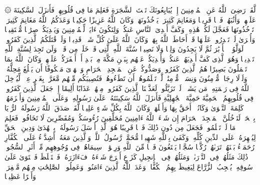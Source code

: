 \startbuffer[\q:48:18]
۞ لَّقَدۡ رَضِیَ ٱللَّهُ عَنِ ٱلۡمُؤۡمِنِینَ إِذۡ یُبَایِعُونَكَ تَحۡتَ ٱلشَّجَرَةِ فَعَلِمَ مَا فِی قُلُوبِهِمۡ فَأَنزَلَ ٱلسَّكِینَةَ عَلَیۡهِمۡ وَأَثَٰبَهُمۡ فَتۡحࣰا قَرِیبࣰا%
\stopbuffer%
\startbuffer[\q:48:19]
وَمَغَانِمَ كَثِیرَةࣰ یَأۡخُذُونَهَاۗ وَكَانَ ٱللَّهُ عَزِیزًا حَكِیمࣰا%
\stopbuffer%
\startbuffer[\q:48:20]
وَعَدَكُمُ ٱللَّهُ مَغَانِمَ كَثِیرَةࣰ تَأۡخُذُونَهَا فَعَجَّلَ لَكُمۡ هَٰذِهِۦ وَكَفَّ أَیۡدِیَ ٱلنَّاسِ عَنكُمۡ وَلِتَكُونَ ءَایَةࣰ لِّلۡمُؤۡمِنِینَ وَیَهۡدِیَكُمۡ صِرَٰطࣰا مُّسۡتَقِیمࣰا%
\stopbuffer%
\startbuffer[\q:48:21]
وَأُخۡرَىٰ لَمۡ تَقۡدِرُوا۟ عَلَیۡهَا قَدۡ أَحَاطَ ٱللَّهُ بِهَاۚ وَكَانَ ٱللَّهُ عَلَىٰ كُلِّ شَیۡءࣲ قَدِیرࣰا%
\stopbuffer%
\startbuffer[\q:48:22]
وَلَوۡ قَٰتَلَكُمُ ٱلَّذِینَ كَفَرُوا۟ لَوَلَّوُا۟ ٱلۡأَدۡبَٰرَ ثُمَّ لَا یَجِدُونَ وَلِیࣰّا وَلَا نَصِیرࣰا%
\stopbuffer%
\startbuffer[\q:48:23]
سُنَّةَ ٱللَّهِ ٱلَّتِی قَدۡ خَلَتۡ مِن قَبۡلُۖ وَلَن تَجِدَ لِسُنَّةِ ٱللَّهِ تَبۡدِیلࣰا%
\stopbuffer%
\startbuffer[\q:48:24]
وَهُوَ ٱلَّذِی كَفَّ أَیۡدِیَهُمۡ عَنكُمۡ وَأَیۡدِیَكُمۡ عَنۡهُم بِبَطۡنِ مَكَّةَ مِنۢ بَعۡدِ أَنۡ أَظۡفَرَكُمۡ عَلَیۡهِمۡۚ وَكَانَ ٱللَّهُ بِمَا تَعۡمَلُونَ بَصِیرًا%
\stopbuffer%
\startbuffer[\q:48:25]
هُمُ ٱلَّذِینَ كَفَرُوا۟ وَصَدُّوكُمۡ عَنِ ٱلۡمَسۡجِدِ ٱلۡحَرَامِ وَٱلۡهَدۡیَ مَعۡكُوفًا أَن یَبۡلُغَ مَحِلَّهُۥۚ وَلَوۡلَا رِجَالࣱ مُّؤۡمِنُونَ وَنِسَاۤءࣱ مُّؤۡمِنَٰتࣱ لَّمۡ تَعۡلَمُوهُمۡ أَن تَطَءُوهُمۡ فَتُصِیبَكُم مِّنۡهُم مَّعَرَّةُۢ بِغَیۡرِ عِلۡمࣲۖ لِّیُدۡخِلَ ٱللَّهُ فِی رَحۡمَتِهِۦ مَن یَشَاۤءُۚ لَوۡ تَزَیَّلُوا۟ لَعَذَّبۡنَا ٱلَّذِینَ كَفَرُوا۟ مِنۡهُمۡ عَذَابًا أَلِیمًا%
\stopbuffer%
\startbuffer[\q:48:26]
إِذۡ جَعَلَ ٱلَّذِینَ كَفَرُوا۟ فِی قُلُوبِهِمُ ٱلۡحَمِیَّةَ حَمِیَّةَ ٱلۡجَٰهِلِیَّةِ فَأَنزَلَ ٱللَّهُ سَكِینَتَهُۥ عَلَىٰ رَسُولِهِۦ وَعَلَى ٱلۡمُؤۡمِنِینَ وَأَلۡزَمَهُمۡ كَلِمَةَ ٱلتَّقۡوَىٰ وَكَانُوۤا۟ أَحَقَّ بِهَا وَأَهۡلَهَاۚ وَكَانَ ٱللَّهُ بِكُلِّ شَیۡءٍ عَلِیمࣰا%
\stopbuffer%
\startbuffer[\q:48:27]
لَّقَدۡ صَدَقَ ٱللَّهُ رَسُولَهُ ٱلرُّءۡیَا بِٱلۡحَقِّۖ لَتَدۡخُلُنَّ ٱلۡمَسۡجِدَ ٱلۡحَرَامَ إِن شَاۤءَ ٱللَّهُ ءَامِنِینَ مُحَلِّقِینَ رُءُوسَكُمۡ وَمُقَصِّرِینَ لَا تَخَافُونَۖ فَعَلِمَ مَا لَمۡ تَعۡلَمُوا۟ فَجَعَلَ مِن دُونِ ذَٰلِكَ فَتۡحࣰا قَرِیبًا%
\stopbuffer%
\startbuffer[\q:48:28]
هُوَ ٱلَّذِیۤ أَرۡسَلَ رَسُولَهُۥ بِٱلۡهُدَىٰ وَدِینِ ٱلۡحَقِّ لِیُظۡهِرَهُۥ عَلَى ٱلدِّینِ كُلِّهِۦۚ وَكَفَىٰ بِٱللَّهِ شَهِیدࣰا%
\stopbuffer%
\startbuffer[\q:48:29]
مُّحَمَّدࣱ رَّسُولُ ٱللَّهِۚ وَٱلَّذِینَ مَعَهُۥۤ أَشِدَّاۤءُ عَلَى ٱلۡكُفَّارِ رُحَمَاۤءُ بَیۡنَهُمۡۖ تَرَىٰهُمۡ رُكَّعࣰا سُجَّدࣰا یَبۡتَغُونَ فَضۡلࣰا مِّنَ ٱللَّهِ وَرِضۡوَٰنࣰاۖ سِیمَاهُمۡ فِی وُجُوهِهِم مِّنۡ أَثَرِ ٱلسُّجُودِۚ ذَٰلِكَ مَثَلُهُمۡ فِی ٱلتَّوۡرَىٰةِۚ وَمَثَلُهُمۡ فِی ٱلۡإِنجِیلِ كَزَرۡعٍ أَخۡرَجَ شَطۡءَهُۥ فَءَازَرَهُۥ فَٱسۡتَغۡلَظَ فَٱسۡتَوَىٰ عَلَىٰ سُوقِهِۦ یُعۡجِبُ ٱلزُّرَّاعَ لِیَغِیظَ بِهِمُ ٱلۡكُفَّارَۗ وَعَدَ ٱللَّهُ ٱلَّذِینَ ءَامَنُوا۟ وَعَمِلُوا۟ ٱلصَّٰلِحَٰتِ مِنۡهُم مَّغۡفِرَةࣰ وَأَجۡرًا عَظِیمَۢا%
